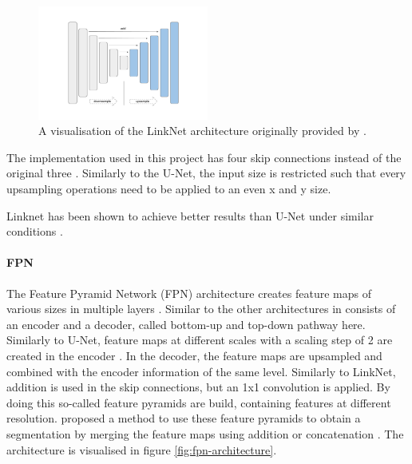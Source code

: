 \begin{figure}
	\centering
	\includegraphics[width=0.5\textwidth]{fig/linknet-architecture.png}
	\caption{A visualisation of the LinkNet architecture originally provided by \citeauthor{SegmentationModels} \cite{SegmentationModels}.}
	\label{fig:linknet-architecture}
\end{figure}



The implementation used in this project has four skip connections instead of the original three \cite{SegmentationModels}. Similarly to the U-Net, the input size is restricted such that every upsampling operations need to be applied to an even x and y size.

Linknet has been shown to achieve better results than U-Net under similar conditions \cite{Gao2022}.

\paragraph{FPN}

The Feature Pyramid Network (FPN) architecture creates feature maps of various sizes in multiple layers \cite{Norelyaqine2023}. Similar to the other architectures in consists of an encoder and a decoder, called bottom-up and top-down pathway here\cite{fpn}. Similarly to U-Net, feature maps at different scales with a scaling step of 2 are created in the encoder \cite{fpn}. In the decoder, the feature maps are upsampled and combined with the encoder information of the same level. Similarly to LinkNet, addition is used in the skip connections, but an 1x1 convolution is applied. By doing this so-called feature pyramids are build, containing features at different resolution. \citeauthor{kirillov2019panoptic} proposed a method to use these feature pyramids to obtain a segmentation by merging the feature maps using addition or concatenation \cite{kirillov2019panoptic, SegmentationModels}. The architecture is visualised in figure \ref{fig:fpn-architecture}.

